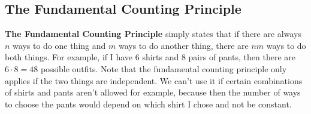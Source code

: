 \documentclass[twocolumn]{article}
\begin{document}
\subsection*{The Fundamental Counting Principle}
\textbf{The Fundamental Counting Principle} simply states that if there are always $n$ ways to do one thing and $m$ ways to do another thing, there are $nm$ ways to do both things.
For example, if I have $6$ shirts and $8$ pairs of pants, then there are $6 \cdot 8 = 48$ possible outfits.
Note that the fundamental counting principle only applies if the two things are independent.
We can't use it if certain combinations of shirts and pants aren't allowed for example, because then the number of ways to choose the pants would depend on which shirt I chose and not be constant.
\end{document}

